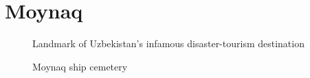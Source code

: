 

\chapter{Moynaq}
\label{cp:moynaq}

    \begin{figure}[htbp]
    \centering
{}
    \caption{Landmark of Uzbekistan's infamous disaster-tourism destination}
    \label{fig:enter-label}
    \end{figure}
\begin{figure}[htbp]
\centering
{}
    \caption{Moynaq ship cemetery}
    \label{fig:enter-label}
\end{figure}
